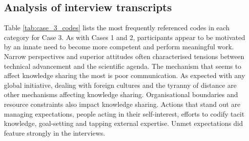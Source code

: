 \subsection{Analysis of interview transcripts}

Table \ref{tab:case_3_codes} lists the most frequently referenced codes in each category for Case 3. As with Cases 1 and 2, participants appear to be motivated by an innate need to become more competent and perform meaningful work. Narrow perspectives and superior attitudes often characterised tensions between technical advancement and the scientific agenda. The mechanism that seems to affect knowledge sharing the most is poor communication. As expected with any global initiative, dealing with foreign cultures and the tyranny of distance are other mechanisms affecting knowledge sharing. Organisational boundaries and resource constraints also impact knowledge sharing. Actions that stand out are managing expectations, people acting in their self-interest, efforts to codify tacit knowledge, goal-setting and tapping external expertise. Unmet expectations did feature strongly in the interviews.

